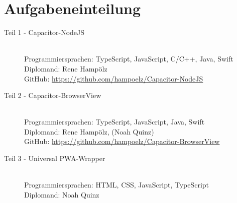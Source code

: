 \section{Aufgabeneinteilung}

\begin{description}
    \item[Teil 1 - Capacitor-NodeJS] \hfill\\
    Programmiersprachen: TypeScript, JavaScript, C/C++, Java, Swift\\
    Diplomand: Rene Hampölz\\
    GitHub: \href{https://github.com/hampoelz/Capacitor-NodeJS}{https://github.com/hampoelz/Capacitor-NodeJS}
    \item[Teil 2 - Capacitor-BrowserView] \hfill\\
    Programmiersprachen: TypeScript, JavaScript, Java, Swift\\
    Diplomand: Rene Hampölz, (Noah Quinz)\\
    GitHub: \href{https://github.com/hampoelz/Capacitor-BrowserView}{https://github.com/hampoelz/Capacitor-BrowserView}
    \item[Teil 3 - Universal PWA-Wrapper] \hfill\\
    Programmiersprachen: HTML, CSS, JavaScript, TypeScript\\
    Diplomand: Noah Quinz
\end{description}